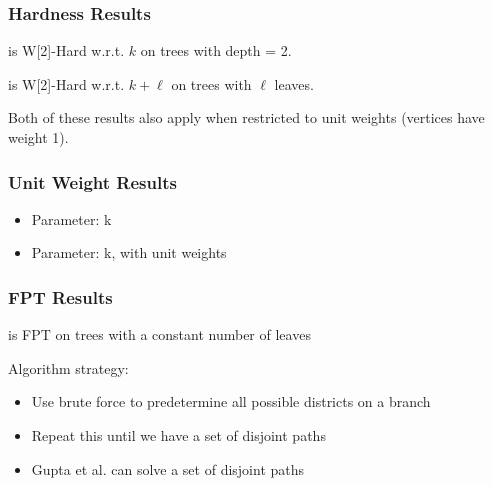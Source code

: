 \begin{frame}
    \frametitle{Hardness Results}
    \begin{theorem}
        \gm is W[2]-Hard w.r.t. $k$ on trees with depth = 2.
    \end{theorem}
    
    \vspace{1.0cm}
     {
    \begin{theorem}
        \gm is W[2]-Hard w.r.t. $k+\ell$ on trees with $\ell$ leaves.
    \end{theorem}
    }
    
    \vspace{1.0cm}
     {
        Both of these results also apply when restricted to unit weights (vertices have weight 1).
    }
    
\end{frame}

\begin{frame}
    \frametitle{Unit Weight Results}
    \begin{itemize}
        \item Parameter: k
    \end{itemize}
	

    \begin{itemize}
        \item Parameter: k, with unit weights
    \end{itemize}
    
\end{frame}

\begin{frame}
    \frametitle{FPT Results}
    \begin{theorem}
        \gm is FPT on trees with a constant number of leaves
    \end{theorem}
    
    \vspace{1.0cm}
     {
        Algorithm strategy:
        \begin{itemize}
            \item Use brute force to predetermine all possible districts on a branch
            \item Repeat this until we have a set of disjoint paths
            \item Gupta et al. can solve a set of disjoint paths
        \end{itemize}
    }
\end{frame}


